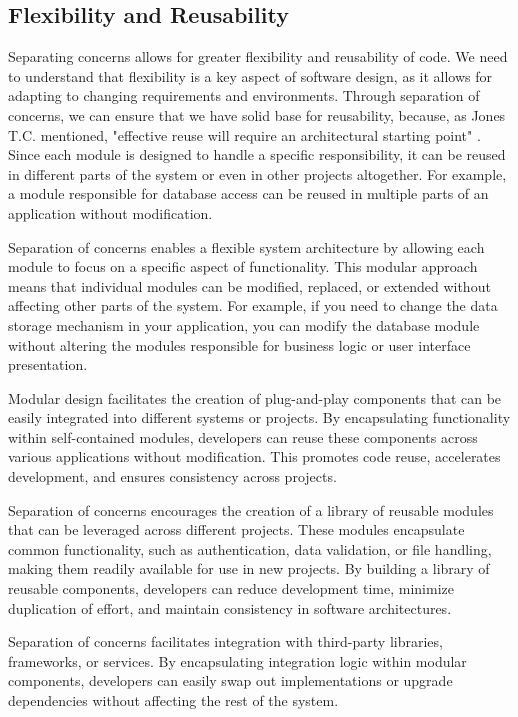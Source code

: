 \subsection{Flexibility and Reusability} 
Separating concerns allows for greater flexibility and reusability of code.
We need to understand that flexibility is a key aspect of software design, as it allows for adapting to changing requirements and environments.
Through separation of concerns, we can ensure that we have solid base for reusability, because, as Jones T.C. mentioned,
"effective reuse will require an architectural starting point" \cite{flexibilityReusability}.
Since each module is designed to handle a specific responsibility, it can be reused in different parts of the system or even in other projects altogether.
For example, a module responsible for database access can be reused in multiple parts of an application without modification.
\par
Separation of concerns enables a flexible system architecture by allowing each module to focus on a specific aspect of functionality.
This modular approach means that individual modules can be modified, replaced, or extended without affecting other parts of the system.
For example, if you need to change the data storage mechanism in your application, you can modify the database module without altering the modules responsible for business logic or user interface presentation.
\par
Modular design facilitates the creation of plug-and-play components that can be easily integrated into different systems or projects.
By encapsulating functionality within self-contained modules, developers can reuse these components across various applications without modification.
This promotes code reuse, accelerates development, and ensures consistency across projects.
\par
Separation of concerns encourages the creation of a library of reusable modules that can be leveraged across different projects.
These modules encapsulate common functionality, such as authentication, data validation, or file handling, making them readily available for use in new projects.
By building a library of reusable components, developers can reduce development time, minimize duplication of effort, and maintain consistency in software architectures.
\par
Separation of concerns facilitates integration with third-party libraries, frameworks, or services.
By encapsulating integration logic within modular components, developers can easily swap out implementations or upgrade dependencies without affecting the rest of the system.

